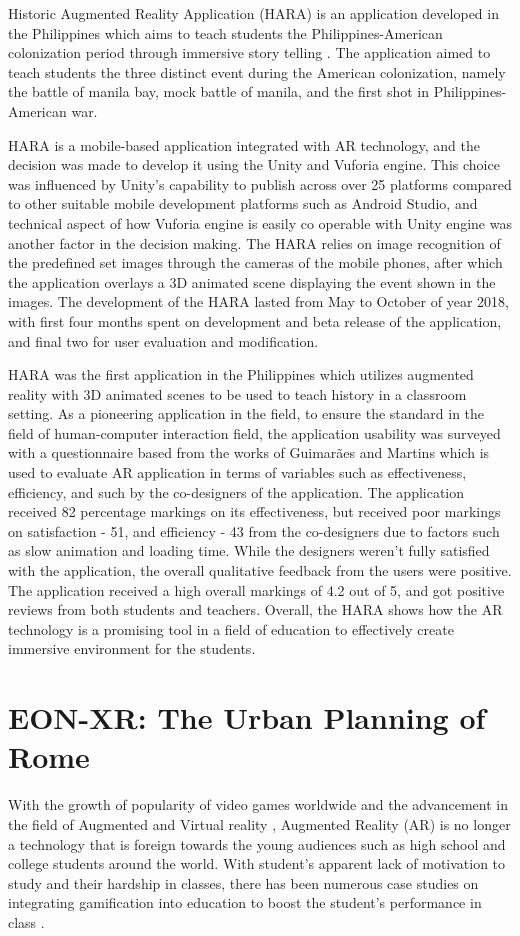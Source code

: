 Historic Augmented Reality Application (HARA) is an application developed in the Philippines which aims to teach students the Philippines-American colonization period through immersive story telling \cite{Hara}. The application aimed to teach students the three distinct event during the American colonization, namely the battle of manila bay, mock battle of manila, and the first shot in Philippines-American war. 

HARA is a mobile-based application integrated with AR technology, and the decision was made to develop it using the Unity and Vuforia engine. This choice was influenced by Unity's capability to publish across over 25 platforms compared to other suitable mobile development platforms such as Android Studio, and technical aspect of how Vuforia engine is easily co operable with Unity engine was another factor in the decision making. The HARA relies on image recognition of the predefined set images through the cameras of the mobile phones, after which the application overlays a 3D animated scene displaying the event shown in the images. The development of the HARA lasted from May to October of year 2018, with first four months spent on development and beta release of the application, and final two for user evaluation and modification. 

HARA was the first application in the Philippines which utilizes augmented reality with 3D animated scenes to be used to teach history in a classroom setting. As a pioneering application in the field, to ensure the standard in the field of human-computer interaction field, the application usability was surveyed with a questionnaire based from the works of Guimarães and Martins which is used to evaluate AR application in terms of variables such as effectiveness, efficiency, and such by the co-designers of the application. The application received 82 percentage markings on its effectiveness, but received poor markings on satisfaction - 51, and efficiency - 43 from the co-designers due to factors such as slow animation and loading time. While the designers weren't fully satisfied with the application, the overall qualitative feedback from the users were positive. The application received a high overall markings of 4.2 out of 5, and got positive reviews from both students and teachers. Overall, the HARA shows how the AR technology is a promising tool in a field of education to effectively create immersive environment for the students.

\section{EON-XR: The Urban Planning of Rome}
With the growth of popularity of video games worldwide and the advancement in the field of Augmented and Virtual reality \cite{enterpriseappstoday2023}, Augmented Reality (AR) is no longer a technology that is foreign towards the young audiences such as high school and college students around the world. With student's apparent lack of motivation to study \cite{medium:mosley} and their hardship in classes, there has been numerous case studies on integrating gamification into education to boost the student's performance in class \cite{watson2011}. 

